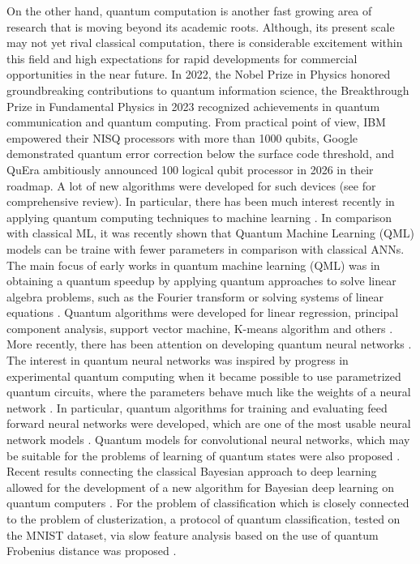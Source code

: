 \documentclass[pra,showkeys,twocolumn,showpacs,aps,10pt]{revtex4-1}
\begin{document}
On the other hand, quantum computation is another fast growing area of research that is moving beyond its academic roots.
Although, its present scale may not yet rival classical computation, there is considerable excitement within this field and high expectations for rapid developments for commercial opportunities in the near future.
In 2022, the Nobel Prize in Physics honored groundbreaking contributions to quantum information science\cite{NobelPrizePhysicsa}, the Breakthrough Prize in Fundamental Physics in 2023 recognized achievements in quantum communication and quantum computing\cite{BreakthroughPrizeWinners}. From practical point of view, IBM  empowered their NISQ processors with more than 1000 qubits\cite{IBMRoadmapQuantumcentric}, Google demonstrated quantum error correction below the surface code threshold\cite{acharyaQuantumErrorCorrection2024}, and QuEra ambitiously announced 100 logical qubit processor in 2026 in their roadmap\cite{QuantumErrorCorrection}.
A lot of new algorithms were developed for such devices (see \cite{Cerezo2021,Bharti2022} for comprehensive review).
In particular, there has been much interest recently in applying quantum computing techniques to machine learning \cite{dunjko2018, biamonte2017, schuld2014, carleo2019, Benedetti2019, Cerezo2022, Sajjan2022}. In comparison with classical ML, it was recently shown that Quantum Machine Learning (QML) models can be traine with fewer parameters in comparison with classical ANNs\cite{abbasPowerQuantumNeural2021,caroGeneralizationQuantumMachine2022}.
The main focus of early works in quantum machine learning (QML) was in obtaining a quantum speedup \cite{biamonte2017, schuld2014} by applying quantum approaches to solve linear algebra problems, such as the Fourier transform or solving systems of linear equations \cite{wiebe2012,harrow2009,childs2017}.
Quantum algorithms were developed for  linear regression, principal component analysis, support vector machine, K-means algorithm and others \cite{lloyd2013,lloyd2014,dunjko2016,paparo2014,rebentrost2014}.
More recently, there has been attention on developing quantum neural networks \cite{kamruzzaman2019, schuld2014b, jeswal2019, broughton2020}.
The interest in quantum neural networks was inspired by progress in experimental quantum computing when it became possible to use parametrized quantum circuits,
where the parameters behave much like the weights of a neural network \cite{lewenstein1994,Benedetti2019}.
In particular, quantum algorithms for training and evaluating feed forward neural networks were developed,
which are one of the most usable neural network models \cite{allcock2018, tacchino2019}. Quantum models for convolutional neural networks, which may be suitable for the problems of learning of quantum states were also proposed \cite{cong2019, liu2019}. Recent results connecting the classical Bayesian approach to deep learning allowed for the development of a new algorithm for Bayesian deep learning on quantum computers \cite{zhao2019,daiQuantumBayesianOptimization2023}. For the problem of classification which is closely connected to the problem of clusterization, a protocol of quantum classification, tested on the MNIST dataset, via slow feature analysis based on the use of quantum Frobenius distance was proposed \cite{kerenidis2018}.
\end{document}
